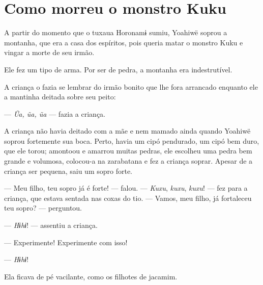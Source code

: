 \chapter{Como morreu o monstro Kuku}

  

A partir do momento que o tuxaua Horonamɨ sumiu, Yoahiwë soprou a
montanha, que era a casa dos espíritos, pois queria matar o monstro Kuku
e vingar a morte de seu irmão. 

Ele fez um tipo de arma. Por ser de pedra, a montanha era
 indestrutível.


A criança o fazia se lembrar do irmão bonito que lhe fora arrancado
enquanto ele a mantinha deitada sobre seu peito:

--- \textit{Ũa, ũa, ũa} --- fazia a criança. 

A criança não havia deitado com a mãe e nem mamado ainda quando Yoahiwë
soprou fortemente sua boca. Perto, havia um cipó pendurado, um cipó bem
duro, que ele torou; amontoou e amarrou muitas pedras, ele escolheu uma
pedra bem grande e volumosa, colocou-a na zarabatana e fez a criança
soprar. Apesar de a criança ser pequena, saiu um sopro forte. 

--- Meu filho, teu sopro já é forte! --- falou. --- \textit{Kuxu}, \textit{kuxu},
\textit{kuxu}! --- fez para a criança, que estava sentada nas coxas do
tio. --- Vamos, meu filho, já fortaleceu teu sopro? --- perguntou.

--- \textit{Hɨhɨ}! --- assentiu a criança. 

--- Experimente! Experimente com isso! 

--- \textit{Hɨhɨ}! 

Ela ficava de pé vacilante, como os filhotes de jacamim. 

